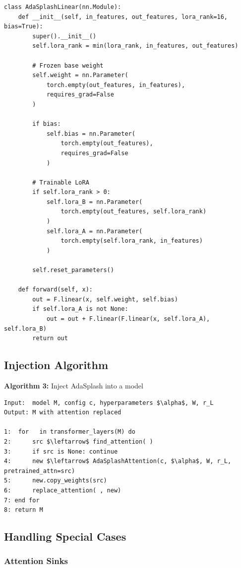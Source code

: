 \begin{lstlisting}
class AdaSplashLinear(nn.Module):
    def __init__(self, in_features, out_features, lora_rank=16, bias=True):
        super().__init__()
        self.lora_rank = min(lora_rank, in_features, out_features)
        
        # Frozen base weight
        self.weight = nn.Parameter(
            torch.empty(out_features, in_features),
            requires_grad=False
        )
        
        if bias:
            self.bias = nn.Parameter(
                torch.empty(out_features),
                requires_grad=False
            )
        
        # Trainable LoRA
        if self.lora_rank > 0:
            self.lora_B = nn.Parameter(
                torch.empty(out_features, self.lora_rank)
            )
            self.lora_A = nn.Parameter(
                torch.empty(self.lora_rank, in_features)
            )
        
        self.reset_parameters()
    
    def forward(self, x):
        out = F.linear(x, self.weight, self.bias)
        if self.lora_A is not None:
            out = out + F.linear(F.linear(x, self.lora_A), self.lora_B)
        return out
\end{lstlisting}

\subsection{Injection Algorithm}

\textbf{Algorithm 3:} Inject AdaSplash into a model
\begin{lstlisting}
Input:  model M, config c, hyperparameters $\alpha$, W, r_L
Output: M with attention replaced

1:  for   in transformer_layers(M) do
2:      src $\leftarrow$ find_attention( )
3:      if src is None: continue
4:      new $\leftarrow$ AdaSplashAttention(c, $\alpha$, W, r_L, pretrained_attn=src)
5:      new.copy_weights(src)
6:      replace_attention( , new)
7: end for
8: return M
\end{lstlisting}

\subsection{Handling Special Cases}

\subsubsection{Attention Sinks}

